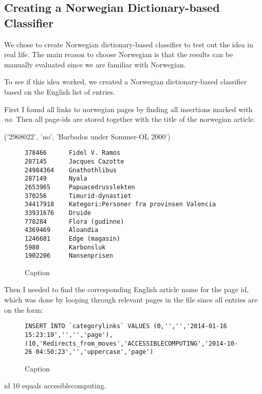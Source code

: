 \subsection{Creating a Norwegian Dictionary-based Classifier}
We chose to create Norwegian dictionary-based classifier to test out the idea in real life. The main reason to choose Norwegian is that the results can be manually evaluated since we are familiar with Norwegian.

To see if this idea worked, we created a Norwegian dictionary-based classifier based on the English list of entries. 
 




First I found all links to norwegian pages by finding all insertions marked with \emph{no}. Then all page-ids are stored together with the title of the norwegian article. 
 
('2968022', 'no', 'Barbados under Sommer-OL 2000')
 
\begin{figure}[h]
\centering
\begin{lstlisting}
378466      Fidel V. Ramos
287145      Jacques Cazotte
24984364    Gnathothlibus
287149      Nyala
2653965     Papuacedrusslekten
370256      Timurid-dynastiet
34417918    Kategori:Personer fra provinsen Valencia
33931676    Druide
778284      Flora (gudinne)
4369469     Aloandia
1246681     Edge (magasin)
5980        Karbonsluk
1902206     Nansenprisen
\end{lstlisting}
\caption{Caption}
\label{fig:my_label}
\end{figure}
 
Then I needed to find the corresponding English article name for the page id, which was done by looping through relevant pages in the \enwikicatlink file since all entries are on the form: 
 
\begin{figure}[h]
\centering
\begin{lstlisting}
INSERT INTO `categorylinks` VALUES (0,'','','2014-01-16 15:23:19','','','page'),(10,'Redirects_from_moves','ACCESSIBLECOMPUTING','2014-10-26 04:50:23','','uppercase','page')
\end{lstlisting}
\caption{Caption}
\label{fig:my_label}
\end{figure}
 
id 10 equals accesiblecomputing. 

